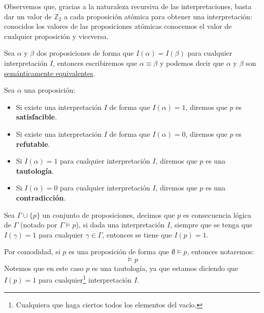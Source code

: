 \begin{observacion}
    Observemos que, gracias a la naturaleza recursiva de las interpretaciones, basta dar un valor de $\mathbb{Z}_2$ a cada proposición atómica para obtener una interpretación: conocidos los valores de las proposiciones atómicas conocemos el valor de cualquier proposición y viceversa.
\end{observacion}

\begin{definicion}
    Sea $\alpha$ y $\beta$ dos proposiciones de forma que $I(\alpha)=I(\beta)$ para cualquier interpretación $I$, entonces escribiremos que $\alpha\equiv\beta$ y podemos decir que $\alpha$ y $\beta$ son \underline{semánticamente equivalentes}.
\end{definicion}

\begin{definicion}
    Sea $\alpha$ una proposición: 
    \begin{itemize}
        \item Si existe una interpretación $I$ de forma que $I(\alpha)=1$, diremos que $p$ es \textbf{satisfacible}.
        \item Si existe una interpretación $I$ de forma que $I(\alpha)=0$, diremos que $p$ es \textbf{refutable}.
        \item Si $I(\alpha)=1$ para cualquier interpretación $I$, diremos que $p$ es una \textbf{tautología}.
        \item Si $I(\alpha)=0$ para cualquier interpretación $I$, diremos que $p$ es una \textbf{contradicción}.
    \end{itemize}
\end{definicion}

\begin{definicion}
    Sea $\Gamma\cup\{p\}$ un conjunto de proposiciones, decimos que $p$ es consecuencia lógica de $\Gamma$ (notado por $\Gamma\vDash p$), si dada una interpretación $I$, siempre que se tenga que $I(\gamma) = 1$ para cualquier $\gamma\in \Gamma$, entonces se tiene que $I(p)= 1$.
\end{definicion}

\begin{notacion}
    Por comodidad, si $p$ es una proposición de forma que $\emptyset \vDash p$, entonces notaremos:
    \begin{equation*}
        \vDash p
    \end{equation*}
    Notemos que en este caso $p$ es una tautología, ya que estamos diciendo que $I(p)=1$ para cualquier\footnote{Cualquiera que haga ciertos todos los elementos del vacío.} interpretación $I$.
\end{notacion}

